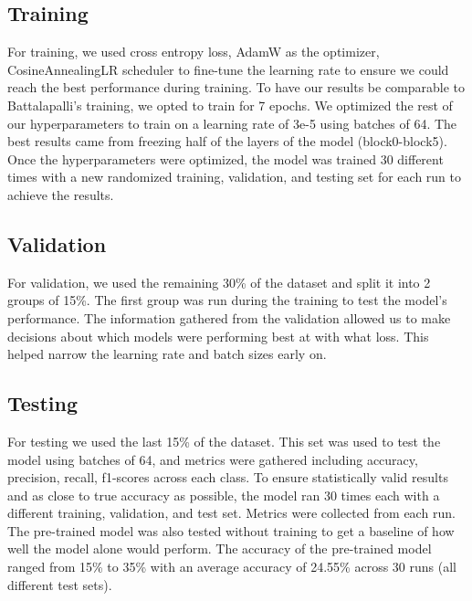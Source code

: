 \documentclass[sigconf]{acmart}
\begin{document}
\subsection{Training}
For training, we used cross entropy loss, AdamW as the optimizer, CosineAnnealingLR scheduler to fine-tune the learning rate to ensure we could reach the best performance during training. To have our results be comparable to Battalapalli’s training, we opted to train for 7 epochs. We optimized the rest of our hyperparameters to train on a learning rate of 3e-5 using batches of 64. The best results came from freezing half of the layers of the model (block0-block5). Once the hyperparameters were optimized, the model was trained 30 different times with a new randomized training, validation, and testing set for each run to achieve the results.

\subsection{Validation}
For validation, we used the remaining 30\% of the dataset and split it into 2 groups of 15\%. The first group was run during the training to test the model’s performance. The information gathered from the validation allowed us to make decisions about which models were performing best at with what loss. This helped narrow the learning rate and batch sizes early on. 

\subsection{Testing}
For testing we used the last 15\% of the dataset. This set was used to test the model using batches of 64, and metrics were gathered including accuracy, precision, recall, f1-scores across each class. To ensure statistically valid results and as close to true accuracy as possible, the model ran 30 times each with a different training, validation, and test set. Metrics were collected from each run. The pre-trained model was also tested without training to get a baseline of how well the model alone would perform. The accuracy of the pre-trained model ranged from 15\% to 35\% with an average accuracy of 24.55\% across 30 runs (all different test sets).
\end{document}
